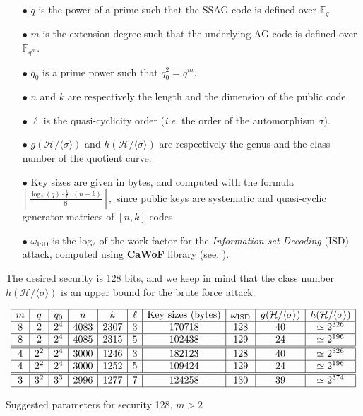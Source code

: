 \documentclass[10pt]{article}
\theoremstyle{definition}
\theoremstyle{definition}
\theoremstyle{definition}
\newcommand{\cd}{\cdot}
\newcommand{\calH}{\mathcal{H}}
\newcommand{\Fqm}{\mathbb{F}_{q^m}}
\newcommand{\Fq}{\mathbb{F}_q}
\newcommand{\w}{\omega}
\begin{document}
\begin{enumerate}
\item[$\bullet$] $q$ is the power of a prime such that the SSAG code is defined over $\Fq$.
\item[$\bullet$] $m$ is the extension degree such that the underlying AG code is defined over $\Fqm$.
\item[$\bullet$] $q_0$ is a prime power such that $q_0^2=q^m$.
\item[$\bullet$] $n$ and $k$ are respectively the length and the dimension of the public code.
\item[$\bullet$] $\ell$ is the quasi-cyclicity order (\textit{i.e.} the order of the automorphism $\sigma$).  
\item[$\bullet$] $g(\calH/\langle \sigma \rangle)$ and $h(\calH/\langle \sigma \rangle)$ are respectively the genus and the class number of the quotient curve.
\item[$\bullet$] Key sizes are given in bytes, and computed with the formula $\left\lceil \frac{\log_{2}(q) \cd \frac{k}{l} \cd (n-k)}{8} \right\rceil,$ since public keys are systematic and quasi-cyclic generator matrices of $[n,k]$-codes.
\item[$\bullet$] $\w_{\mathrm{ISD}}$ is the log$_2$ of the work factor for the \textit{Information-set Decoding} (ISD) attack, computed using \textbf{CaWoF} library (see. \cite{CAWOF}).
\end{enumerate}
The desired security is 128 bits, and we keep in mind that the class number $h(\calH/\langle \sigma \rangle)$ is an upper bound for the brute force attack. 

\begin{table}[htbp]
\begin{equation*}
\begin{array}{|c|c|c|c|c|c|c|c|c|c|}
\hline
m & q & q_0 & n & k & \ell & \mathrm{Key} \ \mathrm{sizes} \ (\mathrm{bytes}) & \w_{\mathrm{ISD}} & g(\calH/\langle \sigma \rangle) & h(\calH/\langle \sigma \rangle) \\
\hline
8 & 2 & 2^4 & 4083 & 2307 & 3 & 170718 & 128 & 40 & \simeq 2^{326} \\
\hline
8 & 2 & 2^4 & 4085 & 2315 & 5 & 102438 & 129 & 24 & \simeq 2^{196} \\
\hline \hline
4 & 2^2 & 2^4 & 3000 & 1246 & 3 & 182123 & 128 & 40 & \simeq 2^{326} \\
\hline
4 & 2^2 & 2^4 & 3000 & 1252 & 5 & 109424 & 129 & 24 & \simeq 2^{196} \\
\hline \hline
3 & 3^2 & 3^3 & 2996 & 1277 & 7 & 124258 & 130 & 39 & \simeq 2^{374} \\
\hline
\end{array}
\end{equation*}
\caption{Suggested parameters for security 128, $m > 2$}
\end{table}
\end{document}
